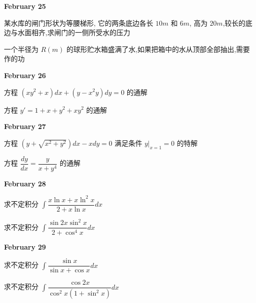 \textcolor{purplea}{\textbf{February 25}}

\begin{example}[][Exam: 28.4.7]
	某水库的闸门形状为等腰梯形, 它的两条底边各长 $10m$ 和 $6m$, 高为 $20m$,较长的底边与水面相齐,求闸门的一侧所受水的压力
\end{example}

\begin{example}[][Exam: 28.4.8]
	一个半径为 $R(m)$ 的球形贮水箱盛满了水,如果把箱中的水从顶部全部抽出,需要作的功
\end{example}

\textcolor{purplea}{\textbf{February 26}}

\begin{example}[][Exam: 28.4.9]
	方程 $(xy^{2}+x)dx+(y-x^{2}y)dy=0$ 的通解
\end{example}

\begin{example}[][Exam: 28.4.10]
	方程 $y'=1+x+y^{2}+xy^{2}$ 的通解
\end{example}

\textcolor{purplea}{\textbf{February 27}}

\begin{example}[][Exam: 28.4.11]
	方程 $(y+\sqrt{x^{2}+y^{2}})dx-xdy=0$ 满足条件 $y|_{x=1}=0$ 的特解
\end{example}

\begin{example}[][Exam: 28.4.12]
	方程 $\dfrac{dy}{dx}=\dfrac{y}{x+y^{4}}$ 的通解
\end{example}

\textcolor{purplea}{\textbf{February 28}}

\begin{example}[][Exam: 28.4.13]
	求不定积分 $\int\dfrac{x\ln x+x\ln^{2}x}{2+x\ln x}dx$
\end{example}

\begin{example}[][Exam: 28.4.14]
	求不定积分 $\int\dfrac{\sin 2x\sin^{2}x}{2+\cos^{4} x}dx$
\end{example}

\textcolor{purplea}{\textbf{February 29}}
\begin{example}[][Exam: 28.4.15]
	求不定积分 $\int\dfrac{\sin x}{\sin x+\cos x}dx$
\end{example}

\begin{example}[][Exam: 28.4.16]
	求不定积分 $\int\dfrac{\cos 2x}{\cos^{2} x(1+\sin^{2} x)}dx$
\end{example}


